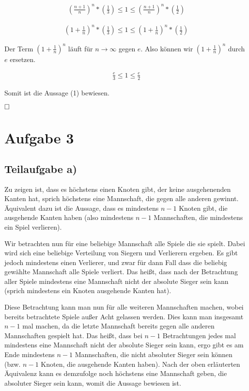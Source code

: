 \documentclass[12pt]{scrartcl}%
\theoremstyle{nonumberplain}
\begin{document}
\begin{align*}
	(\frac{n+1}{n})^{n} * (\frac{1}{3}) \le 1 \le (\frac{n+1}{n})^{n} * (\frac{1}{2})
\end{align*}

\begin{align*}
	(1 + \frac{1}{n})^{n} * (\frac{1}{3}) \le 1 \le (1 + \frac{1}{n})^{n} * (\frac{1}{2})
\end{align*}

Der Term $(1 + \frac{1}{n})^{n}$ läuft für $n \rightarrow \infty$ gegen $e$. Also können wir $(1 + \frac{1}{n})^{n}$ durch $e$ ersetzen.

\begin{align*}
	\frac{e}{3} \le 1 \le \frac{e}{2}
\end{align*}

Somit ist die Aussage (1) bewiesen.

$\hfill \square$

\newpage

\section*{Aufgabe 3}
\subsection*{Teilaufgabe a)}

Zu zeigen ist, dass es höchstens einen Knoten gibt, der keine ausgehenenden Kanten hat, sprich höchstens eine Mannschaft, die gegen alle anderen gewinnt. Äquivalent dazu ist die Aussage, dass es mindestens $n-1$ Knoten gibt, die ausgehende Kanten haben (also mindestens $n-1$ Mannschaften, die mindestens ein Spiel verlieren).

Wir betrachten nun für eine beliebige Mannschaft alle Spiele die sie spielt. Dabei wird sich eine beliebige Verteilung von Siegern und Verlierern ergeben. Es gibt jedoch mindestens einen Verlierer, und zwar für dann Fall dass die beliebig gewählte Mannschaft alle Spiele verliert. Das heißt, dass nach der Betrachtung aller Spiele mindestens eine Mannschaft nicht der absolute Sieger sein kann (sprich mindestens ein Knoten ausgehende Kanten hat).

Diese Betrachtung kann man nun für alle weiteren Mannschaften machen, wobei bereits betrachtete Spiele außer Acht gelassen werden. Dies kann man insgesamt $n-1$ mal machen, da die letzte Mannschaft bereits gegen alle anderen Mannschaften gespielt hat. Das heißt, dass bei $n-1$ Betrachtungen jedes mal mindestens eine Mannschaft nicht der absolute Sieger sein kann, ergo gibt es am Ende mindestens $n-1$ Mannschaften, die nicht absoluter Sieger sein können (bzw. $n-1$ Knoten, die ausgehende Kanten haben). Nach der oben erläuterten Äquivalenz kann es demzufolge noch höchstens eine Mannschaft geben, die absoluter Sieger sein kann, womit die Aussage bewiesen ist.
\end{document}
